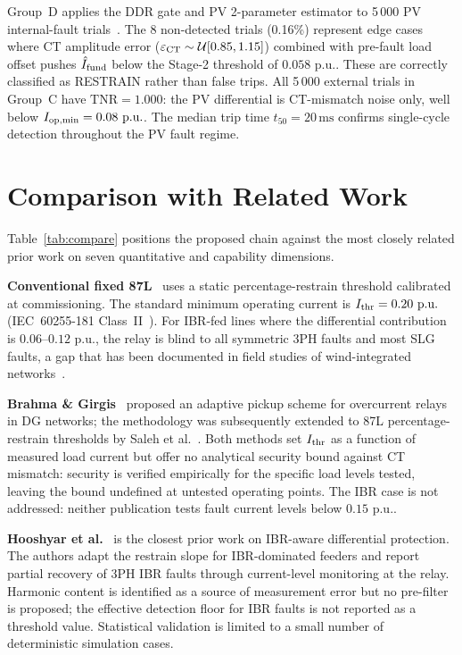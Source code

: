 \documentclass[journal,twoside,10pt]{IEEEtran}
\newcommand{\pu}{\,\text{p.u.}}
\begin{document}
Group~D applies the DDR gate and PV 2-parameter estimator to 5\,000 PV
internal-fault trials~\cite{SAMBP_TR62}.
The 8 non-detected trials (0.16\%) represent edge cases where CT amplitude
error ($\varepsilon_{\rm CT} \sim \mathcal{U}[0.85,1.15]$) combined with
pre-fault load offset pushes $\hat{I}_{\rm fund}$ below the Stage-2 threshold
of $0.058\,\pu$.  These are correctly classified as RESTRAIN rather than
false trips.
All 5\,000 external trials in Group~C have $\text{TNR}=1.000$: the PV
differential is CT-mismatch noise only, well below $I_{\rm op,min}=0.08\,\pu$.
The median trip time $t_{50} = 20\,\text{ms}$ confirms single-cycle detection
throughout the PV fault regime.

\section{Comparison with Related Work}
\label{sec:comparison}

Table~\ref{tab:compare} positions the proposed chain against the most
closely related prior work on seven quantitative and capability dimensions.

\textbf{Conventional fixed 87L}~\cite{Blackburn2006,Schweitzer2014} uses
a static percentage-restrain threshold calibrated at commissioning.
The standard minimum operating current is $I_{\rm thr} = 0.20\,\pu$
(IEC~60255-181 Class~II~\cite{IEC_60255_181}).
For IBR-fed lines where the differential contribution is
$0.06$--$0.12\,\pu$, the relay is blind to all symmetric 3PH faults and
most SLG faults, a gap that has been documented in field studies of
wind-integrated networks~\cite{Hooshyar2019}.

\textbf{Brahma \& Girgis}~\cite{Brahma2004} proposed an adaptive
pickup scheme for overcurrent relays in DG networks; the methodology was
subsequently extended to 87L percentage-restrain thresholds by
Saleh et al.~\cite{Saleh2017}.  Both methods set $I_{\rm thr}$ as a
function of measured load current but offer no analytical security bound
against CT mismatch: security is verified empirically for the specific
load levels tested, leaving the bound undefined at untested operating points.
The IBR case is not addressed: neither publication tests fault current
levels below $0.15\,\pu$.

\textbf{Hooshyar et al.}~\cite{Hooshyar2019} is the closest prior work
on IBR-aware differential protection.  The authors adapt the restrain
slope for IBR-dominated feeders and report partial recovery of 3PH IBR
faults through current-level monitoring at the relay.  Harmonic content
is identified as a source of measurement error but no pre-filter is
proposed; the effective detection floor for IBR faults is not reported
as a threshold value.  Statistical validation is limited to a small number
of deterministic simulation cases.
\end{document}

